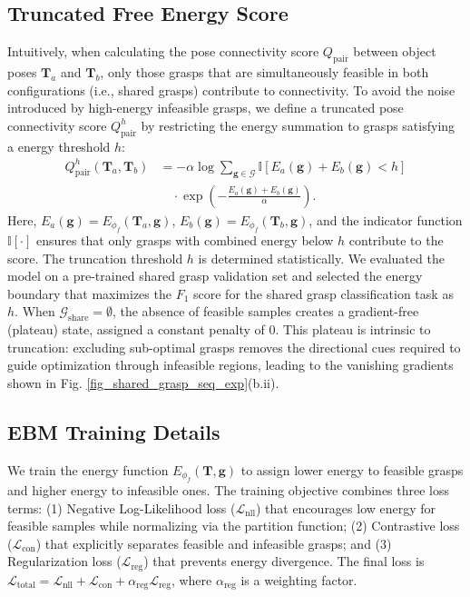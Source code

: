 \documentclass[journal, twoside]{IEEEtran}
\begin{document}
\subsection{Truncated Free Energy Score}
Intuitively, when calculating the pose connectivity score $Q_\mathrm{pair}$ between object poses $\mathbf{T}_{a}$ and $\mathbf{T}_{b}$, only those grasps that are simultaneously feasible in both configurations (i.e., shared grasps) contribute to connectivity. To avoid the noise introduced by high-energy infeasible grasps, we define a truncated pose connectivity score $Q^h_\mathrm{pair}$ by restricting the energy summation to grasps satisfying a energy threshold $h$:
\begin{equation}
\begin{split}
    Q^{h}_{\mathrm{pair}}(\mathbf{T}_a, \mathbf{T}_b) 
    &= -\alpha \log \sum_{\boldsymbol{g} \in \mathcal{G}}
    \mathbb{I}\!\left[
        E_{a}(\boldsymbol{g}) + E_{b}(\boldsymbol{g}) < h
    \right] \\
    &\quad \cdot \exp \left(
        -\frac{E_{a}(\boldsymbol{g}) + E_{b}(\boldsymbol{g})}{\alpha}
    \right).
\end{split}
    \label{eq_truncated_free_energy}
\end{equation}
Here, $E_{a}(\boldsymbol{g}) \!=\! E_{\phi_f}(\mathbf{T}_{a}, \boldsymbol{g})$, $E_{b}(\boldsymbol{g}) \!=\! E_{\phi_f}(\mathbf{T}_{b}, \boldsymbol{g})$, and the indicator function $\mathbb{I}[\cdot]$ ensures that only grasps with combined energy below $h$ contribute to the score. The truncation threshold $h$ is determined statistically. We evaluated the model on a pre-trained shared grasp validation set and selected the energy boundary that maximizes the $F_1$ score for the shared grasp classification task as $h$. When $\mathcal{G}_{\mathrm{share}} = \emptyset$, the absence of feasible samples creates a gradient-free (plateau) state, assigned a constant penalty of 0. This plateau is intrinsic to truncation: excluding sub-optimal grasps removes the directional cues required to guide optimization through infeasible regions, leading to the vanishing gradients shown in Fig. \ref{fig_shared_grasp_seq_exp}(b.ii).

\subsection{EBM Training Details}
\label{Appendix_EBM_Training}
We train the energy function $E_{\phi_f}(\mathbf{T}, \boldsymbol{g})$ to assign lower energy to feasible grasps and higher energy to infeasible ones. The training objective combines three loss terms: (1) Negative Log-Likelihood loss ($\mathcal{L}_{\text{nll}}$) that encourages low energy for feasible samples while normalizing via the partition function; (2) Contrastive loss ($\mathcal{L}_{\text{con}}$) that explicitly separates feasible and infeasible grasps; and (3) Regularization loss ($\mathcal{L}_{\text{reg}}$) that prevents energy divergence. The final loss is $\mathcal{L}_{\text{total}} = \mathcal{L}_{\text{nll}} + \mathcal{L}_{\text{con}} + \alpha_{\mathrm{reg}}\mathcal{L}_{\text{reg}}$, where $\alpha_{\mathrm{reg}}$ is a weighting factor.
\end{document}
